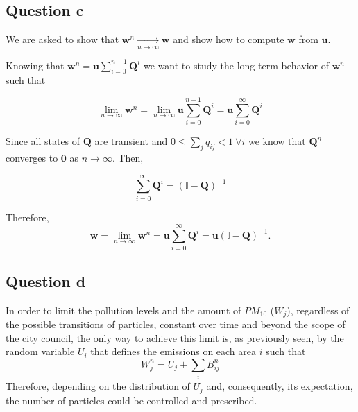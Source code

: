 \documentclass[11pt, a4paper]{article}
\begin{document}
\subsection{Question c}
We are asked to show that $\mathbf w^n \xrightarrow[n\rightarrow \infty]{} \mathbf w$ and show how to compute $\mathbf w$ from $\mathbf u$.

Knowing that $\mathbf w^n = \mathbf u \sum_{i=0}^{n-1} \mathbf Q^i$  we want to study the long term behavior of $\mathbf w^n$ such that

\[
\lim_{n \rightarrow \infty} \mathbf w^n = \lim_{n \rightarrow \infty} \mathbf u \sum_{i=0}^{n-1}\mathbf Q^i = \mathbf u \sum_{i=0}^{\infty}\mathbf Q^i
\]

Since all states of $\mathbf Q$ are transient and $0 \leq \sum_j q_{ij} < 1 \ \forall i $ we know that $\mathbf Q^n$ converges to $\mathbf 0$ as $n \rightarrow \infty$. Then,

\[
\sum^\infty_{i=0}\mathbf Q^i = (\mathbb I - \mathbf Q)^{-1}
\]

Therefore, 
\[
\mathbf w = \lim_{n \rightarrow \infty} \mathbf w^n = \mathbf u \sum_{i=0}^{\infty}\mathbf Q^i = \mathbf u (\mathbb I - \mathbf Q)^{-1}.
\]

\subsection{Question d}

In order to limit the pollution levels and the amount of $PM_{10}$ ($W_j$), regardless of the possible transitions of particles, constant over time and beyond the scope of the city council, the only way to achieve this limit is, as previously seen, by the random variable $U_i$ that defines the emissions on each area $i$ such that
\[
W_j^n = U_j + \sum_iB_{ij}^n
\]
Therefore, depending on the distribution of $U_j$ and, consequently, its expectation, the number of particles could be controlled and prescribed.
\end{document}
